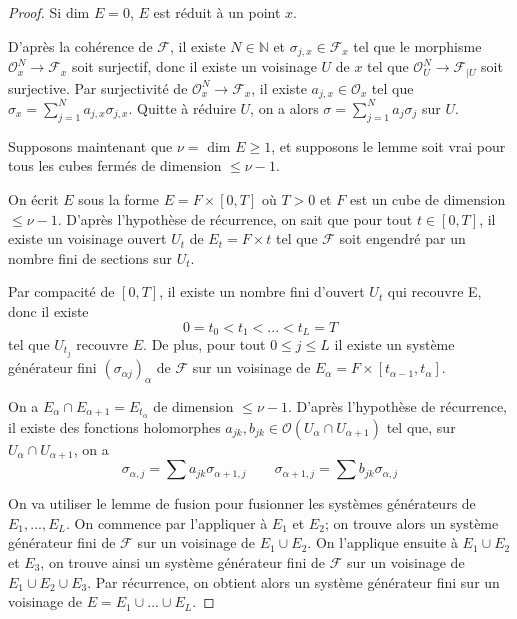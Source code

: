\documentclass{article}
\theoremstyle{definition}
\theoremstyle{remark}
\begin{document}
\begin{proof}
Si dim $E = 0$, $E$ est réduit à un point $x$.

D'après la cohérence de $\mathcal{F}$, il existe $N \in \mathbb{N}$ et $\sigma_{j,x} \in \mathcal{F}_x$ tel que le morphisme $\mathcal{O}^N_x \to \mathcal{F}_x$ soit surjectif, donc il existe un voisinage $U$ de $x$ tel que $\mathcal{O}^N_U \to \mathcal{F}_{|U}$ soit surjective.
Par surjectivité de $\mathcal{O}^N_x \to \mathcal{F}_x$, il existe $a_{j,x} \in \mathcal{O}_x$ tel que $\sigma_x = \sum_{j=1}^N a_{j,x}\sigma_{j,x}$. Quitte à réduire $U$, on a alors $\sigma = \sum_{j=1}^N a_j\sigma_j$ sur $U$.

Supposons maintenant que $\nu = $ dim $E \geq 1$, et supposons le lemme soit vrai pour tous les cubes fermés de dimension $\leq \nu - 1$.

On écrit $E$ sous la forme $E = F \times [0, T]$ où $T > 0$ et $F$ est un cube de dimension $\leq \nu - 1$. D'après l'hypothèse de récurrence, on sait que pour tout $t \in [0, T]$, il existe un voisinage ouvert $U_t$ de $E_t = F \times {t}$ tel que $\mathcal{F}$ soit engendré par un nombre fini de sections sur $U_t$.

Par compacité de $[0, T]$, il existe un nombre fini d'ouvert $U_t$ qui recouvre E, donc il existe $$0 = t_0 < t_1 < ... < t_L = T$$ tel que ${U_{t_j}}$ recouvre $E$. De plus, pour tout $0 \leq j \leq L$ il existe un système générateur fini $(\sigma_{\alpha j})_\alpha$ de $\mathcal{F}$ sur un voisinage de $E_\alpha = F \times [t_{\alpha - 1}, t_\alpha]$.

On a $E_\alpha \cap E_{\alpha+1} = E_{t_\alpha}$ de dimension $\leq \nu - 1$. D'après l'hypothèse de récurrence, il existe des fonctions holomorphes $a_{jk}, b_{jk} \in \mathcal{O}(U_\alpha \cap U_{\alpha +1})$ tel que, sur $U_\alpha \cap U_{\alpha +1}$, on a
\begin{equation*}
\sigma_{\alpha,j} = \sum a_{jk}\sigma_{\alpha+1,j} \qquad
\sigma_{\alpha+1,j} = \sum b_{jk}\sigma_{\alpha,j}
\end{equation*}

On va utiliser le lemme de fusion pour fusionner les systèmes générateurs de $E_1, ..., E_L$. On commence par l'appliquer à $E_1$ et $E_2$; on trouve alors un système générateur fini de $\mathcal{F}$ sur un voisinage de $E_1 \cup E_2$. On l'applique ensuite à $E_1 \cup E_2$ et $E_3$, on trouve ainsi un système générateur fini de $\mathcal{F}$ sur un voisinage de $E_1 \cup E_2 \cup E_3$. Par récurrence, on obtient alors un système générateur fini sur un voisinage de $E=E_1 \cup ... \cup E_L$.


\end{proof}
\end{document}
